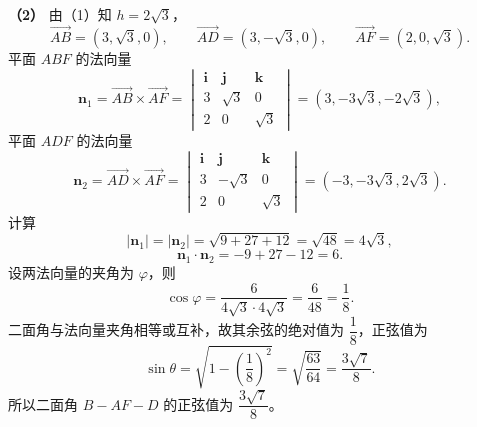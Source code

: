 \begin{answer}
\textbf{（2）} 由（1）知 $h=2\sqrt3$，
\nopagebreak[4]
\[\overrightarrow{AB}=(3,\sqrt3,0),\qquad\overrightarrow{AD}=(3,-\sqrt3,0),\qquad\overrightarrow{AF}=(2,0,\sqrt3).\]
平面 $ABF$ 的法向量
\nopagebreak[4]
\[\boldsymbol n_1=\overrightarrow{AB}\times\overrightarrow{AF}
=\begin{vmatrix}\boldsymbol i&\boldsymbol j&\boldsymbol k\\ 3&\sqrt3&0\\ 2&0&\sqrt3\end{vmatrix}
=(3,-3\sqrt3,-2\sqrt3),\]
平面 $ADF$ 的法向量
\nopagebreak[4]
\[\boldsymbol n_2=\overrightarrow{AD}\times\overrightarrow{AF}
=\begin{vmatrix}\boldsymbol i&\boldsymbol j&\boldsymbol k\\ 3&-\sqrt3&0\\ 2&0&\sqrt3\end{vmatrix}
=(-3,-3\sqrt3,2\sqrt3).\]
计算
\nopagebreak[4]
\[|\boldsymbol n_1|=|\boldsymbol n_2|=\sqrt{9+27+12}=\sqrt{48}=4\sqrt3,\]
\nopagebreak[4]
\[\boldsymbol n_1\cdot\boldsymbol n_2=-9+27-12=6.\]
设两法向量的夹角为 $\varphi$，则
\nopagebreak[4]
\[\cos\varphi=\frac6{4\sqrt3\cdot4\sqrt3}=\frac6{48}=\frac18.\]
二面角与法向量夹角相等或互补，故其余弦的绝对值为 $\dfrac18$，正弦值为
\nopagebreak[4]
\[\sin\theta=\sqrt{1-\left(\frac18\right)^2}=\sqrt{\frac{63}{64}}=\frac{3\sqrt7}8.\]
所以二面角 $B-AF-D$ 的正弦值为 $\dfrac{3\sqrt7}8$。



\end{answer}
